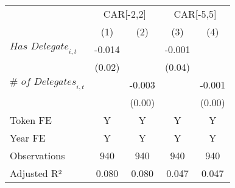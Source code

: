 {
\def\sym#1{\ifmmode^{#1}\else\(^{#1}\)\fi}
\begin{tabular}{l*{4}{c}}
\toprule
                    &\multicolumn{2}{c}{CAR[-2,2]}              &\multicolumn{2}{c}{CAR[-5,5]}              \\\cmidrule(lr){2-3}\cmidrule(lr){4-5}
                    &\multicolumn{1}{c}{(1)}         &\multicolumn{1}{c}{(2)}         &\multicolumn{1}{c}{(3)}         &\multicolumn{1}{c}{(4)}         \\
\midrule
$\textit{Has Delegate}_{i,t}$&      -0.014         &                     &      -0.001         &                     \\
                    &      (0.02)         &                     &      (0.04)         &                     \\
$\textit{# of Delegates}_{i,t}$&                     &      -0.003         &                     &      -0.001         \\
                    &                     &      (0.00)         &                     &      (0.00)         \\
\midrule
Token FE            &           Y         &           Y         &           Y         &           Y         \\
Year FE             &           Y         &           Y         &           Y         &           Y         \\
Observations        &         940         &         940         &         940         &         940         \\
Adjusted R²         &       0.080         &       0.080         &       0.047         &       0.047         \\
\bottomrule
\end{tabular}
}
